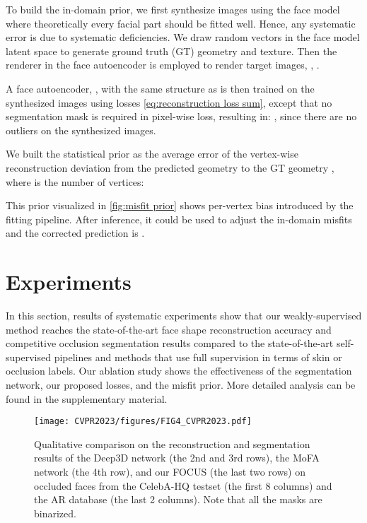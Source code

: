 \documentclass[10pt,twocolumn,letterpaper]{article}
\begin{document}
To build the in-domain prior, we first synthesize images using the face model where theoretically every facial part should be fitted well. Hence,
any systematic error is due to systematic deficiencies. We draw random vectors  in the face model latent space to generate ground truth (GT)  geometry and texture. Then the renderer in the face autoencoder is employed to render target images, , .

A face autoencoder, , with the same structure as  is then trained on the synthesized images using losses \cref{eq:reconstruction loss sum}, except that no segmentation mask is required in pixel-wise loss, resulting in: , since there are no outliers on the synthesized images.
    
We built the statistical prior as the average error of the vertex-wise reconstruction deviation from the predicted geometry  to the GT geometry , where  is the number of vertices:

This prior visualized in \cref{fig:misfit prior} shows per-vertex bias introduced by the fitting pipeline. After inference, it could be used to adjust the in-domain misfits and the corrected prediction is .


\section{Experiments}

In this section, results of systematic experiments show that our weakly-supervised method reaches the state-of-the-art face shape reconstruction accuracy and competitive occlusion segmentation results compared to the state-of-the-art self-supervised pipelines and methods that use full supervision in terms of skin or occlusion labels.
Our ablation study shows the effectiveness of the segmentation network, our proposed losses, and the misfit prior. More detailed analysis can be found in the supplementary material.
  \begin{figure}[b!]
  \centering
  
  \texttt{[image: CVPR2023/figures/FIG4\_CVPR2023.pdf]}
  \caption{Qualitative comparison on the reconstruction and segmentation results of the Deep3D \cite{deng2019accurate} network (the 2nd and 3rd rows), the MoFA network \cite{tewari2017mofa} (the 4th row), and our FOCUS (the last two rows) on occluded faces from the CelebA-HQ testset (the first 8 columns) and the AR database (the last 2 columns). Note that all the masks are binarized.}
 \label{Visual Comparison}
\end{figure}
\end{document}
